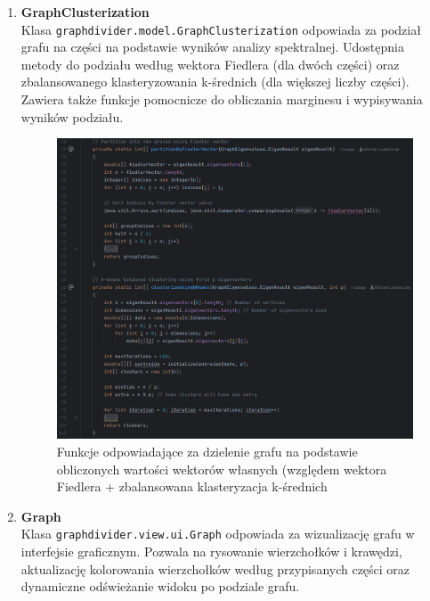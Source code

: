 \documentclass{article}
\begin{document}
\begin{enumerate}
        \item \textbf{GraphClusterization} \\
        Klasa \texttt{graphdivider.model.GraphClusterization} odpowiada za podział grafu na części na podstawie wyników analizy spektralnej. Udostępnia metody do podziału według wektora Fiedlera (dla dwóch części) oraz zbalansowanego klasteryzowania k-średnich (dla większej liczby części). Zawiera także funkcje pomocnicze do obliczania marginesu i wypisywania wyników podziału.

        \begin{figure}[H]
            \centering
            \includegraphics[width=1\linewidth]{img/clusterization.png}
            \caption{Funkcje odpowiadające za dzielenie grafu na podstawie obliczonych wartości wektorów własnych (względem wektora Fiedlera + zbalansowana klasteryzacja k-średnich}
            \label{fig:enter-label}
        \end{figure}
    
        \item \textbf{Graph} \\
        Klasa \texttt{graphdivider.view.ui.Graph} odpowiada za wizualizację grafu w interfejsie graficznym. Pozwala na rysowanie wierzchołków i krawędzi, aktualizację kolorowania wierzchołków według przypisanych części oraz dynamiczne odświeżanie widoku po podziale grafu.
        

\end{enumerate}
\end{document}
